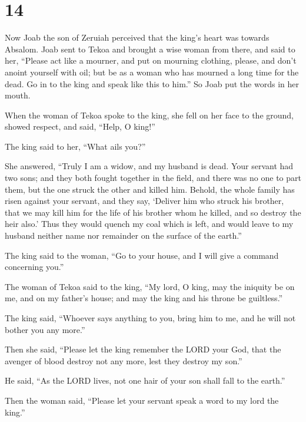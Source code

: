 \hypertarget{section-13}{%
\section{14}\label{section-13}}

 Now Joab the son of Zeruiah perceived that the king's
heart was towards Absalom.  Joab sent to Tekoa and brought
a wise woman from there, and said to her, ``Please act like a mourner,
and put on mourning clothing, please, and don't anoint yourself with
oil; but be as a woman who has mourned a long time for the dead.
 Go in to the king and speak like this to him.'' So Joab
put the words in her mouth.

 When the woman of Tekoa spoke to the king, she fell on
her face to the ground, showed respect, and said, ``Help, O king!''

 The king said to her, ``What ails you?''

She answered, ``Truly I am a widow, and my husband is dead.
 Your servant had two sons; and they both fought together
in the field, and there was no one to part them, but the one struck the
other and killed him.  Behold, the whole family has risen
against your servant, and they say, `Deliver him who struck his brother,
that we may kill him for the life of his brother whom he killed, and so
destroy the heir also.' Thus they would quench my coal which is left,
and would leave to my husband neither name nor remainder on the surface
of the earth.''

 The king said to the woman, ``Go to your house, and I
will give a command concerning you.''

 The woman of Tekoa said to the king, ``My lord, O king,
may the iniquity be on me, and on my father's house; and may the king
and his throne be guiltless.''

 The king said, ``Whoever says anything to you, bring him
to me, and he will not bother you any more.''

 Then she said, ``Please let the king remember the LORD
your God, that the avenger of blood destroy not any more, lest they
destroy my son.''

He said, ``As the LORD lives, not one hair of your son shall fall to the
earth.''

 Then the woman said, ``Please let your servant speak a
word to my lord the king.''

